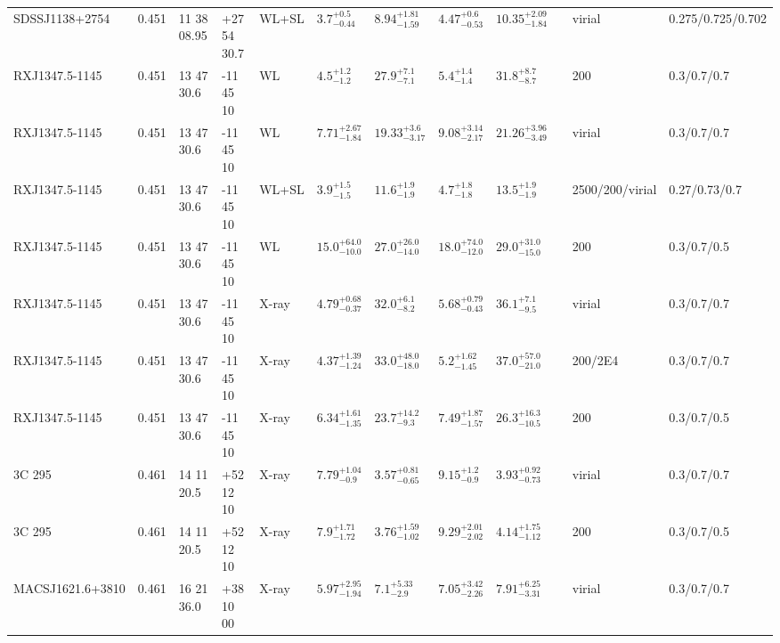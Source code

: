\begin{landscape}
\begin{center}
{\begin{longtable}{llllllllllll}
SDSSJ1138+2754 & 0.451 & 11 38 08.95 & +27 54 30.7 & WL+SL & ${3.7}^{+0.5}_{-0.44}$ & ${8.94}^{+1.81}_{-1.59}$ & ${4.47}^{+0.6}_{-0.53}$ & ${10.35}^{+2.09}_{-1.84}$ & \citet{OG12.1} & virial & 0.275/0.725/0.702 \\
RXJ1347.5-1145 & 0.451 & 13 47 30.6 & -11 45 10 & WL & ${4.5}^{+1.2}_{-1.2}$ & ${27.9}^{+7.1}_{-7.1}$ & ${5.4}^{+1.4}_{-1.4}$ & ${31.8}^{+8.7}_{-8.7}$ & \citet{SE14.1} & 200 & 0.3/0.7/0.7 \\
RXJ1347.5-1145 & 0.451 & 13 47 30.6 & -11 45 10 & WL & ${7.71}^{+2.67}_{-1.84}$ & ${19.33}^{+3.6}_{-3.17}$ & ${9.08}^{+3.14}_{-2.17}$ & ${21.26}^{+3.96}_{-3.49}$ & \citet{UM11.1} & virial & 0.3/0.7/0.7 \\
RXJ1347.5-1145 & 0.451 & 13 47 30.6 & -11 45 10 & WL+SL & ${3.9}^{+1.5}_{-1.5}$ & ${11.6}^{+1.9}_{-1.9}$ & ${4.7}^{+1.8}_{-1.8}$ & ${13.5}^{+1.9}_{-1.9}$ & \citet{ME14.1} & 2500/200/virial & 0.27/0.73/0.7 \\
RXJ1347.5-1145 & 0.451 & 13 47 30.6 & -11 45 10 & WL & ${15.0}^{+64.0}_{-10.0}$ & ${27.0}^{+26.0}_{-14.0}$ & ${18.0}^{+74.0}_{-12.0}$ & ${29.0}^{+31.0}_{-15.0}$ & \citet{KL05.1} & 200 & 0.3/0.7/0.5 \\
RXJ1347.5-1145 & 0.451 & 13 47 30.6 & -11 45 10 & X-ray & ${4.79}^{+0.68}_{-0.37}$ & ${32.0}^{+6.1}_{-8.2}$ & ${5.68}^{+0.79}_{-0.43}$ & ${36.1}^{+7.1}_{-9.5}$ & \citet{SC07.1} & virial & 0.3/0.7/0.7 \\
RXJ1347.5-1145 & 0.451 & 13 47 30.6 & -11 45 10 & X-ray & ${4.37}^{+1.39}_{-1.24}$ & ${33.0}^{+48.0}_{-18.0}$ & ${5.2}^{+1.62}_{-1.45}$ & ${37.0}^{+57.0}_{-21.0}$ & \citet{VO06.1} & 200/2E4 & 0.3/0.7/0.7 \\
RXJ1347.5-1145 & 0.451 & 13 47 30.6 & -11 45 10 & X-ray & ${6.34}^{+1.61}_{-1.35}$ & ${23.7}^{+14.2}_{-9.3}$ & ${7.49}^{+1.87}_{-1.57}$ & ${26.3}^{+16.3}_{-10.5}$ & \citet{AL03.1} & 200 & 0.3/0.7/0.5 \\
3C 295 & 0.461 & 14 11 20.5 & +52 12 10 & X-ray & ${7.79}^{+1.04}_{-0.9}$ & ${3.57}^{+0.81}_{-0.65}$ & ${9.15}^{+1.2}_{-0.9}$ & ${3.93}^{+0.92}_{-0.73}$ & \citet{SC07.1} & virial & 0.3/0.7/0.7 \\
3C 295 & 0.461 & 14 11 20.5 & +52 12 10 & X-ray & ${7.9}^{+1.71}_{-1.72}$ & ${3.76}^{+1.59}_{-1.02}$ & ${9.29}^{+2.01}_{-2.02}$ & ${4.14}^{+1.75}_{-1.12}$ & \citet{AL03.1} & 200 & 0.3/0.7/0.5 \\
MACSJ1621.6+3810 & 0.461 & 16 21 36.0 & +38 10 00 & X-ray & ${5.97}^{+2.95}_{-1.94}$ & ${7.1}^{+5.33}_{-2.9}$ & ${7.05}^{+3.42}_{-2.26}$ & ${7.91}^{+6.25}_{-3.31}$ & \citet{SC07.1} & virial & 0.3/0.7/0.7 \\

\end{longtable}}
\end{center}
\end{landscape}
